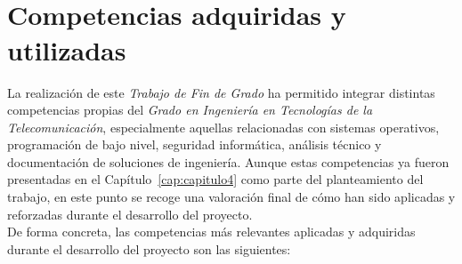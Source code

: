 \

\

\section{Competencias adquiridas y utilizadas}

La realización de este \textit{Trabajo de Fin de Grado} ha permitido integrar distintas competencias propias del \textit{Grado en Ingeniería en Tecnologías de la Telecomunicación}, especialmente aquellas relacionadas con sistemas operativos, programación de bajo nivel, seguridad informática, análisis técnico y documentación de soluciones de ingeniería.
Aunque estas competencias ya fueron presentadas en el Capítulo~\ref{cap:capitulo4} como parte del planteamiento del trabajo, en este punto se recoge una valoración final de cómo han sido aplicadas y reforzadas durante el desarrollo del proyecto.\\

De forma concreta, las competencias más relevantes aplicadas y adquiridas durante el desarrollo del proyecto son las siguientes:

